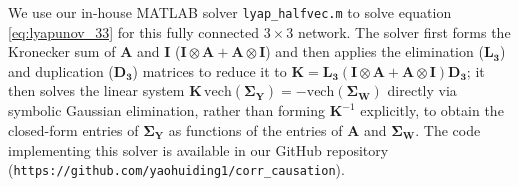 \documentclass{article}
\begin{document}

We use our in-house MATLAB solver \texttt{lyap\_halfvec.m} to solve equation \ref{eq:lyapunov_33} for this fully connected $3\times3$ network. The solver first forms the Kronecker sum of $\mathbf{A}$ and $\mathbf{I}$ ($\mathbf{I}\otimes\mathbf{A}+\mathbf{A}\otimes\mathbf{I}$) and then applies the elimination ($\mathbf{L_3}$) and duplication ($\mathbf{D_3}$) matrices to reduce it to $\mathbf{K}=\mathbf{L_3}(\mathbf{I}\otimes\mathbf{A}+\mathbf{A}\otimes\mathbf{I})\mathbf{D_3}$; it then solves the linear system $\mathbf{K}\,\mathrm{vech}(\boldsymbol{\Sigma}_\mathbf{Y}) = -\mathrm{vech}(\boldsymbol{\Sigma}_\mathbf{W})$ directly via symbolic Gaussian elimination, rather than forming $\mathbf{K}^{-1}$ explicitly, to obtain the closed-form entries of $\boldsymbol{\Sigma}_\mathbf{Y}$ as functions of the entries of $\mathbf{A}$ and $\boldsymbol{\Sigma}_\mathbf{W}$. The code implementing this solver is available in our GitHub repository (\texttt{https://github.com/yaohuiding1/corr\_causation}).
\end{document}
